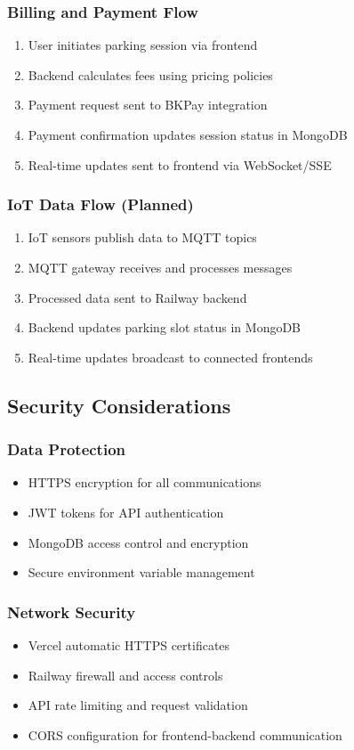 \subsubsection{Billing and Payment Flow}
\begin{enumerate}
\item User initiates parking session via frontend
\item Backend calculates fees using pricing policies
\item Payment request sent to BKPay integration
\item Payment confirmation updates session status in MongoDB
\item Real-time updates sent to frontend via WebSocket/SSE
\end{enumerate}

\subsubsection{IoT Data Flow (Planned)}
\begin{enumerate}
\item IoT sensors publish data to MQTT topics
\item MQTT gateway receives and processes messages
\item Processed data sent to Railway backend
\item Backend updates parking slot status in MongoDB
\item Real-time updates broadcast to connected frontends
\end{enumerate}

\subsection{Security Considerations}

\subsubsection{Data Protection}
\begin{itemize}
\item HTTPS encryption for all communications
\item JWT tokens for API authentication
\item MongoDB access control and encryption
\item Secure environment variable management
\end{itemize}

\subsubsection{Network Security}
\begin{itemize}
\item Vercel automatic HTTPS certificates
\item Railway firewall and access controls
\item API rate limiting and request validation
\item CORS configuration for frontend-backend communication
\end{itemize}

